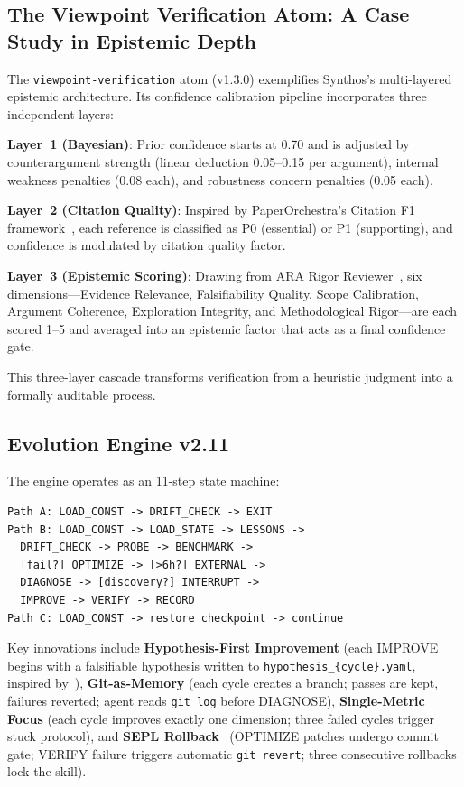 \documentclass[review]{elsarticle}
\begin{document}
\subsection{The Viewpoint Verification Atom: A Case Study in Epistemic Depth}

The \texttt{viewpoint-verification} atom (v1.3.0) exemplifies Synthos's multi-layered epistemic architecture. Its confidence calibration pipeline incorporates three independent layers:

\textbf{Layer~1 (Bayesian)}: Prior confidence starts at 0.70 and is adjusted by counterargument strength (linear deduction 0.05--0.15 per argument), internal weakness penalties (0.08 each), and robustness concern penalties (0.05 each).

\textbf{Layer~2 (Citation Quality)}: Inspired by PaperOrchestra's Citation F1 framework~\cite{song2026paperorchestra}, each reference is classified as P0 (essential) or P1 (supporting), and confidence is modulated by citation quality factor.

\textbf{Layer~3 (Epistemic Scoring)}: Drawing from ARA Rigor Reviewer~\cite{orchestra2026airesearch}, six dimensions---Evidence Relevance, Falsifiability Quality, Scope Calibration, Argument Coherence, Exploration Integrity, and Methodological Rigor---are each scored 1--5 and averaged into an epistemic factor that acts as a final confidence gate.

This three-layer cascade transforms verification from a heuristic judgment into a formally auditable process.

\subsection{Evolution Engine v2.11}

The engine operates as an 11-step state machine:

\begin{verbatim}
Path A: LOAD_CONST -> DRIFT_CHECK -> EXIT
Path B: LOAD_CONST -> LOAD_STATE -> LESSONS ->
  DRIFT_CHECK -> PROBE -> BENCHMARK ->
  [fail?] OPTIMIZE -> [>6h?] EXTERNAL ->
  DIAGNOSE -> [discovery?] INTERRUPT ->
  IMPROVE -> VERIFY -> RECORD
Path C: LOAD_CONST -> restore checkpoint -> continue
\end{verbatim}

Key innovations include \textbf{Hypothesis-First Improvement} (each IMPROVE begins with a falsifiable hypothesis written to \texttt{hypothesis\_\{cycle\}.yaml}, inspired by~\cite{yang2026aris}), \textbf{Git-as-Memory} (each cycle creates a branch; passes are kept, failures reverted; agent reads \texttt{git log} before DIAGNOSE), \textbf{Single-Metric Focus} (each cycle improves exactly one dimension; three failed cycles trigger stuck protocol), and \textbf{SEPL Rollback}~\cite{skyworkai2026deep} (OPTIMIZE patches undergo commit gate; VERIFY failure triggers automatic \texttt{git revert}; three consecutive rollbacks lock the skill).
\end{document}
